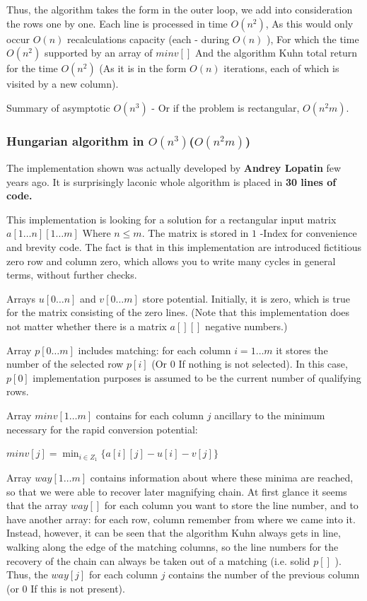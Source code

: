Thus, the algorithm takes the form in the outer loop, we add into consideration the rows one by one. Each line is processed in time $O (n ^ 2)$, As this would only occur $O (n)$ recalculations capacity (each - during $O (n)$ ), For which the time $O (n ^ 2)$ supported by an array of $minv []$ And the algorithm Kuhn total return for the time $O (n ^ 2)$ (As it is in the form $O (n)$ iterations, each of which is visited by a new column).

Summary of asymptotic $O (n ^ 3)$ - Or if the problem is rectangular, $O (n ^ 2 m)$.

\subsubsection{ Hungarian algorithm in $O (n ^ 3)$($O (n ^ 2 m)$)}

The implementation shown was actually developed by \textbf{Andrey Lopatin} few years ago. It is surprisingly laconic whole algorithm is placed in \textbf{30 lines of code.}

This implementation is looking for a solution for a rectangular input matrix $a [1 \ldots n][1 \ldots m]$ Where $n \le m$. The matrix is ​​stored in $1$ -Index for convenience and brevity code. The fact is that in this implementation are introduced fictitious zero row and column zero, which allows you to write many cycles in general terms, without further checks.

Arrays $u [0 \ldots n]$ and $v [0 \ldots m]$ store potential. Initially, it is zero, which is true for the matrix consisting of the zero lines. (Note that this implementation does not matter whether there is a matrix $a [][]$ negative numbers.)

Array $p [0 \ldots m]$ includes matching: for each column $i = 1 \ldots m$ it stores the number of the selected row $p [i]$ (Or $0$ If nothing is not selected). In this case, $p [0]$ implementation purposes is assumed to be the current number of qualifying rows.

Array $minv [1 \ldots m]$ contains for each column $j$ ancillary to the minimum necessary for the rapid conversion potential:

$minv[j]=\min_{i\in Z_{1}}\{a[i][j]-u[i]-v[j]\}$

Array $way [1 \ldots m]$ contains information about where these minima are reached, so that we were able to recover later magnifying chain. At first glance it seems that the array $way []$ for each column you want to store the line number, and to have another array: for each row, column remember from where we came into it. Instead, however, it can be seen that the algorithm Kuhn always gets in line, walking along the edge of the matching columns, so the line numbers for the recovery of the chain can always be taken out of a matching (i.e. solid $p []$ ). Thus, the $way [j]$ for each column $j$ contains the number of the previous column (or $0$ If this is not present).

